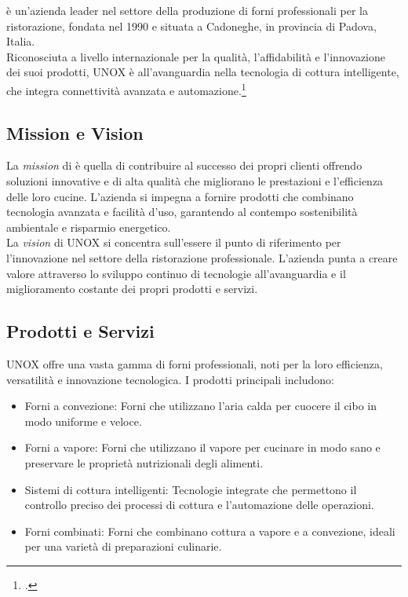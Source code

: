 \myAzienda è un'azienda leader nel settore della produzione di forni professionali per la ristorazione, fondata nel 1990 e situata a Cadoneghe, in provincia di Padova, Italia.
\\Riconosciuta a livello internazionale per la qualità, l'affidabilità e l'innovazione dei suoi prodotti, UNOX è all'avanguardia nella tecnologia di cottura intelligente, che integra connettività avanzata e automazione.\footcite{site:unox_sito}

\subsection{Mission e Vision}
La \textit{mission} di \myAzienda è quella di contribuire al successo dei propri clienti offrendo soluzioni innovative e di alta qualità che migliorano le prestazioni e l'efficienza delle loro cucine.
L'azienda si impegna a fornire prodotti che combinano tecnologia avanzata e facilità d'uso, garantendo al contempo sostenibilità ambientale e risparmio energetico.
\\La \textit{vision} di UNOX si concentra sull'essere il punto di riferimento per l'innovazione nel settore della ristorazione professionale.
L'azienda punta a creare valore attraverso lo sviluppo continuo di tecnologie all'avanguardia e il miglioramento costante dei propri prodotti e servizi.

\subsection{Prodotti e Servizi}
UNOX offre una vasta gamma di forni professionali, noti per la loro efficienza, versatilità e innovazione tecnologica.
I prodotti principali includono:
\begin{itemize}
    \item Forni a convezione: Forni che utilizzano l'aria calda per cuocere il cibo in modo uniforme e veloce.
    \item Forni a vapore: Forni che utilizzano il vapore per cucinare in modo sano e preservare le proprietà nutrizionali degli alimenti.
    \item Sistemi di cottura intelligenti: Tecnologie integrate che permettono il controllo preciso dei processi di cottura e l'automazione delle operazioni.
    \item Forni combinati: Forni che combinano cottura a vapore e a convezione, ideali per una varietà di preparazioni culinarie.
\end{itemize}

